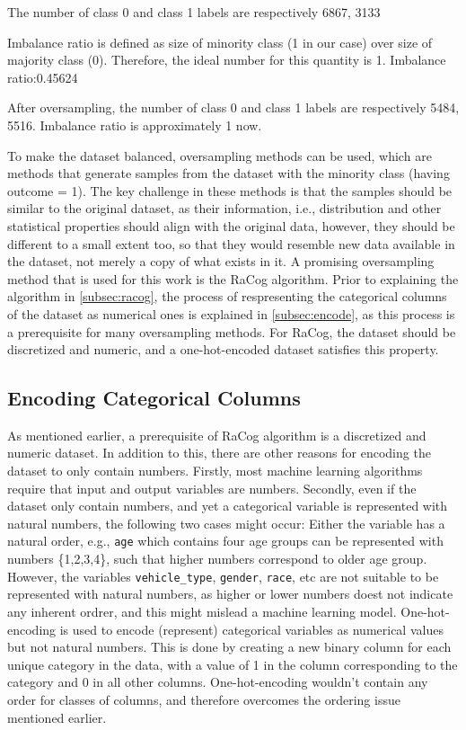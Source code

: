\documentclass{article}
\begin{document}
The number of class 0 and class 1 labels are respectively 6867, 3133

Imbalance ratio is defined as size of minority class (1 in our case)
over size of majority class (0). Therefore, the ideal number for this
quantity is 1. Imbalance ratio:0.45624

After oversampling, the number of class 0 and class 1 labels are
respectively 5484, 5516. Imbalance ratio is approximately 1 now.

To make the dataset balanced, oversampling methods can be used, which
are methods that generate samples from the dataset with the minority
class (having outcome = 1). The key challenge in these methods is that
the samples should be similar to the original dataset, as their
information, i.e., distribution and other statistical properties should
align with the original data, however, they should be different to a
small extent too, so that they would resemble new data available in the
dataset, not merely a copy of what exists in it. A promising
oversampling method that is used for this work is the RaCog algorithm.
Prior to explaining the algorithm in \ref{subsec:racog}, the process of
respresenting the categorical columns of the dataset as numerical ones
is explained in \ref{subsec:encode}, as this process is a prerequisite
for many oversampling methods. For RaCog, the dataset should be
discretized and numeric, and a one-hot-encoded dataset satisfies this
property.

\hypertarget{encoding-categorical-columns}{%
\subsection{\texorpdfstring{Encoding Categorical Columns
\label{subsec:encode}}{Encoding Categorical Columns }}\label{encoding-categorical-columns}}

As mentioned earlier, a prerequisite of RaCog algorithm is a discretized
and numeric dataset. In addition to this, there are other reasons for
encoding the dataset to only contain numbers. Firstly, most machine
learning algorithms require that input and output variables are numbers.
Secondly, even if the dataset only contain numbers, and yet a
categorical variable is represented with natural numbers, the following
two cases might occur: Either the variable has a natural order, e.g.,
\texttt{age} which contains four age groups can be represented with
numbers \{1,2,3,4\}, such that higher numbers correspond to older age
group. However, the variables \texttt{vehicle\_type}, \texttt{gender},
\texttt{race}, etc are not suitable to be represented with natural
numbers, as higher or lower numbers doest not indicate any inherent
ordrer, and this might mislead a machine learning model.
One-hot-encoding is used to encode (represent) categorical variables as
numerical values but not natural numbers. This is done by creating a new
binary column for each unique category in the data, with a value of 1 in
the column corresponding to the category and 0 in all other columns.
One-hot-encoding wouldn't contain any order for classes of columns, and
therefore overcomes the ordering issue mentioned earlier.
\end{document}
